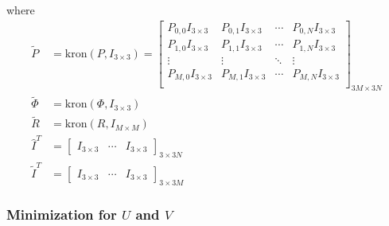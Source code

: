 \documentclass[10pt]{article}
\newcommand{\trans}[1]{#1^{T}}
\newcommand{\kron}{\mathrm{kron}}
\begin{document}
where
\begin{align*}
    \tilde{P} & = \kron(P,I_{3\times3}) = \begin{bmatrix}
                      P_{0,0}I_{3\times3} & P_{0,1}I_{3\times3} & \cdots & P_{0,N}I_{3\times3}\\
                      P_{1,0}I_{3\times3} & P_{1,1}I_{3\times3} & \cdots & P_{1,N}I_{3\times3}\\
                      \vdots & \vdots & \ddots & \vdots\\
                      P_{M,0}I_{3\times3} & P_{M,1}I_{3\times3} & \cdots & P_{M,N}I_{3\times3}\\
                  \end{bmatrix}_{3M\times3N}\\
    \tilde{\Phi} & = \kron(\Phi,I_{3\times3})\\
    \tilde{R} & = \kron(R, I_{M\times M})\\
    \trans{\hat{I}} & = \begin{bmatrix}
                    I_{3\times3} & \cdots & I_{3\times3}
                \end{bmatrix}_{3\times 3N}\\
    \trans{\tilde{I}} & = \begin{bmatrix}
                    I_{3\times3} & \cdots & I_{3\times3}
                \end{bmatrix}_{3\times 3M}
\end{align*}

\subsubsection*{Minimization for \texorpdfstring{$U$ and $V$}{U and V}}
\end{document}

